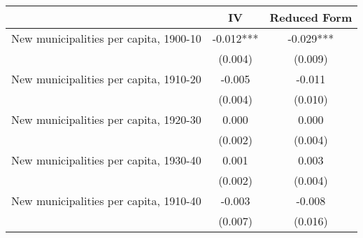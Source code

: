  \begin{tabular}{l*{2}{c}} \toprule
                &\multicolumn{1}{c}{IV}&\multicolumn{1}{c}{Reduced Form}\\
\midrule
New municipalities per capita, 1900-10&   -0.012***&   -0.029***\\
                &  (0.004)   &  (0.009)   \\
\addlinespace
New municipalities per capita, 1910-20&   -0.005   &   -0.011   \\
                &  (0.004)   &  (0.010)   \\
\addlinespace
New municipalities per capita, 1920-30&    0.000   &    0.000   \\
                &  (0.002)   &  (0.004)   \\
\addlinespace
New municipalities per capita, 1930-40&    0.001   &    0.003   \\
                &  (0.002)   &  (0.004)   \\
\addlinespace
New municipalities per capita, 1910-40&   -0.003   &   -0.008   \\
                &  (0.007)   &  (0.016)   \\
       \bottomrule \end{tabular}

